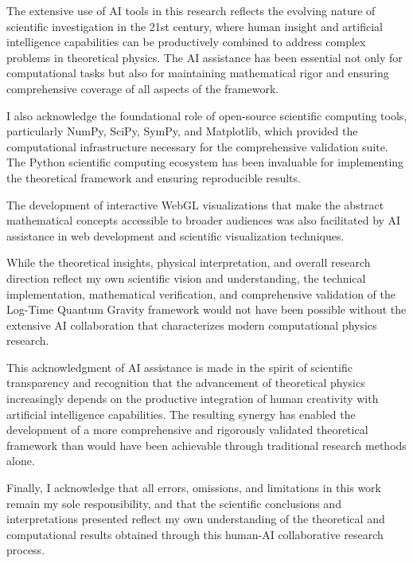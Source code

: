 The extensive use of AI tools in this research reflects the evolving nature of scientific investigation in the 21st century, where human insight and artificial intelligence capabilities can be productively combined to address complex problems in theoretical physics. The AI assistance has been essential not only for computational tasks but also for maintaining mathematical rigor and ensuring comprehensive coverage of all aspects of the framework.

I also acknowledge the foundational role of open-source scientific computing tools, particularly NumPy, SciPy, SymPy, and Matplotlib, which provided the computational infrastructure necessary for the comprehensive validation suite. The Python scientific computing ecosystem has been invaluable for implementing the theoretical framework and ensuring reproducible results.

The development of interactive WebGL visualizations that make the abstract mathematical concepts accessible to broader audiences was also facilitated by AI assistance in web development and scientific visualization techniques.

While the theoretical insights, physical interpretation, and overall research direction reflect my own scientific vision and understanding, the technical implementation, mathematical verification, and comprehensive validation of the Log-Time Quantum Gravity framework would not have been possible without the extensive AI collaboration that characterizes modern computational physics research.

This acknowledgment of AI assistance is made in the spirit of scientific transparency and recognition that the advancement of theoretical physics increasingly depends on the productive integration of human creativity with artificial intelligence capabilities. The resulting synergy has enabled the development of a more comprehensive and rigorously validated theoretical framework than would have been achievable through traditional research methods alone.

Finally, I acknowledge that all errors, omissions, and limitations in this work remain my sole responsibility, and that the scientific conclusions and interpretations presented reflect my own understanding of the theoretical and computational results obtained through this human-AI collaborative research process.